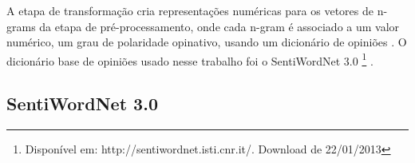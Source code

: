 
A etapa de transformação cria representações numéricas para os vetores de n-grams da etapa de pré-processamento, onde cada n-gram é associado a um valor numérico, um grau de polaridade opinativo, usando um dicionário de opiniões \cite{ballhysa2012fuzzy, moraes2012document, mouthami2013sentiment}. O dicionário base de opiniões usado nesse trabalho foi o SentiWordNet 3.0 \footnote{Disponível em: http://sentiwordnet.isti.cnr.it/. Download de 22/01/2013} \cite{baccianella2010sentiwordnet}.

\subsection{SentiWordNet 3.0}

